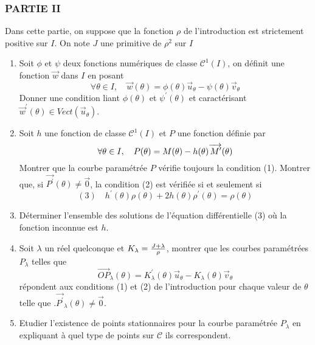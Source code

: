 \subsubsection*{PARTIE II}

Dans cette partie, on suppose que la fonction $\rho $ de l'introduction est
strictement positive sur $I.$ On note $J$ une primitive de $\rho ^{2}$ sur $%
I $

\begin{enumerate}
\item  Soit $\phi $ et $\psi $ deux fonctions num\'{e}riques de classe $%
\mathcal{C}^{1}(I)$, on d\'{e}finit une fonction $\overrightarrow{w}$ dans $%
I $ en posant 
\[
\forall \theta \in I,\quad \overrightarrow{w}(\theta )=\phi (\theta )%
\overrightarrow{u}_{\theta }-\psi (\theta )\overrightarrow{v}_{\theta } 
\]
Donner une condition liant $\phi (\theta )$ et $\psi ^{\prime }(\theta )$ et
caract\'{e}risant $\overrightarrow{w}^{\prime }(\theta )\in Vect(%
\overrightarrow{u}_{\theta })$.

\item  Soit $h$ une fonction de classe $\mathcal{C}^{1}(I)$ et $P$ une
fonction d\'{e}finie par 
\[
\forall \theta \in I,\quad P(\theta )=M(\theta )-h(\theta )\overrightarrow{%
\,M^{\prime }}(\theta ) 
\]
Montrer que la courbe param\'{e}tr\'{e}e $P$ v\'{e}rifie toujours la
condition (1). Montrer que, si $\overrightarrow{P^{\prime }}(\theta )\neq
\overrightarrow{0}$, la condition (2) est v\'{e}rifi\'{e}e si et seulement
si 
\[
(3)\quad h^{\prime }(\theta )\rho (\theta )+2h(\theta )\rho ^{\prime
}(\theta )=\rho (\theta ) 
\]

\item  D\'{e}terminer l'ensemble des solutions de l'\'{e}quation
diff\'{e}rentielle (3) o\`{u} la fonction inconnue est $h$.

\item  Soit $\lambda $ un r\'{e}el quelconque et $K_{\lambda }=\frac{%
J+\lambda }{\rho }$, montrer que les courbes param\'{e}tr\'{e}es $P_{\lambda
}$ telles que 
\[
\overrightarrow{OP}_{\lambda }(\theta )=K_{\lambda }^{\prime }(\theta )%
\overrightarrow{u}_{\theta }-K_{\lambda }(\theta )\overrightarrow{v}_{\theta
} 
\]
r\'{e}pondent aux conditions (1) et (2) de l'introduction pour chaque valeur
de $\theta $ telle que .$\overrightarrow{P^{\prime }}_{\lambda }(\theta
)\neq \overrightarrow{0}$.\newline

\item  Etudier l'existence de points stationnaires pour la courbe
param\'{e}tr\'{e}e $P_{\lambda }$ en expliquant \`{a} quel type de points
sur $\mathcal{C}$ ils correspondent.


\end{enumerate}
